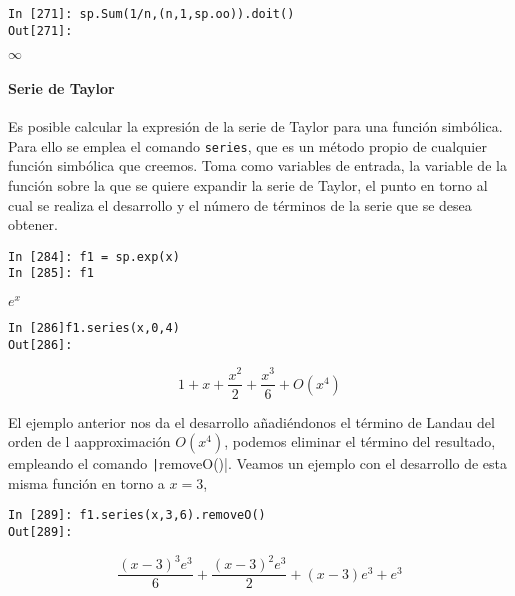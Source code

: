 \begin{center}
	\begin{minipage}{.6\textwidth}
		\begin{verbatim}
In [271]: sp.Sum(1/n,(n,1,sp.oo)).doit()
Out[271]:
		\end{verbatim}
	    $\infty$
	\end{minipage}
\end{center}

\begin{paracol}{2}
\paragraph{Serie de Taylor} Es posible calcular la expresión de la serie de Taylor para una función simbólica. Para ello se emplea el comando \texttt{series}, que es un método propio de cualquier función simbólica que creemos. Toma como variables de entrada, la variable de la función sobre la que se quiere expandir la serie de Taylor, el punto en torno al cual se realiza el desarrollo y el número de términos de la serie que se desea obtener.
\end{paracol}

\begin{center}
	\begin{minipage}{.3\textwidth}
		\begin{verbatim}
In [284]: f1 = sp.exp(x)
In [285]: f1	
		\end{verbatim}
		$e^x$
		\begin{verbatim}
In [286]f1.series(x,0,4)
Out[286]:
		\end{verbatim}
		\begin{equation*}
		1+x+\frac{x^2}{2}+\frac{x^3}{6}+ O(x^4)
		\end{equation*}
	\end{minipage}
\end{center}

\begin{paracol}{2}
El ejemplo anterior nos da el desarrollo añadiéndonos el término de Landau del orden de l aapproximación $O(x^4)$, podemos eliminar el término del resultado, empleando el comando \texttt|removeO()|. Veamos un ejemplo con el desarrollo de esta misma función en torno a $x=3$,
\end{paracol}
 
 
\begin{center}
	\begin{minipage}{.3\textwidth}
		\begin{verbatim}
In [289]: f1.series(x,3,6).removeO()
Out[289]: 
		\end{verbatim}
		\begin{equation*}			
			\frac{(x-3)^3e^3}{6}+\frac{(x-3)^2e^3}{2}+(x-3)e^3+e^3
		\end{equation*}
	\end{minipage}
\end{center}

